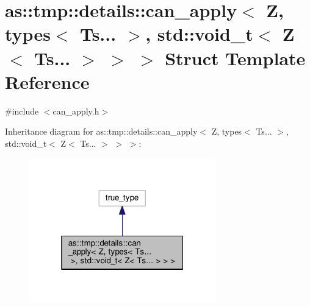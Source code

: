 \hypertarget{structas_1_1tmp_1_1details_1_1can__apply_3_01Z_00_01types_3_01Ts_8_8_8_01_4_00_01std_1_1void__t_d0380c4f39b26cf3dcf2ed45500ba357}{}\section{as\+:\+:tmp\+:\+:details\+:\+:can\+\_\+apply$<$ Z, types$<$ Ts... $>$, std\+:\+:void\+\_\+t$<$ Z$<$ Ts... $>$ $>$ $>$ Struct Template Reference}
\label{structas_1_1tmp_1_1details_1_1can__apply_3_01Z_00_01types_3_01Ts_8_8_8_01_4_00_01std_1_1void__t_d0380c4f39b26cf3dcf2ed45500ba357}


{\ttfamily \#include $<$can\+\_\+apply.\+h$>$}



Inheritance diagram for as\+:\+:tmp\+:\+:details\+:\+:can\+\_\+apply$<$ Z, types$<$ Ts... $>$, std\+:\+:void\+\_\+t$<$ Z$<$ Ts... $>$ $>$ $>$\+:\nopagebreak
\begin{figure}[H]
\begin{center}
\leavevmode
\includegraphics[width=229pt]{structas_1_1tmp_1_1details_1_1can__apply_3_01Z_00_01types_3_01Ts_8_8_8_01_4_00_01std_1_1void__t_299e711cbe14dcd24ae19586cb63c206}
\end{center}
\end{figure}


